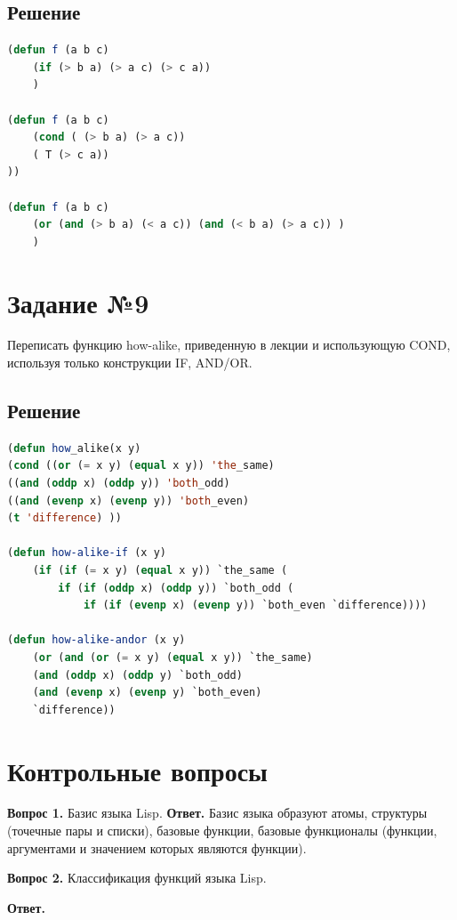 \documentclass[12pt]{report}
\begin{document}
\subsection*{Решение}
\begin{lstlisting}[label=8,caption=Решение задания №8, language=lisp]
(defun f (a b c)
	(if (> b a) (> a c) (> c a))
	)

(defun f (a b c)
	(cond ( (> b a) (> a c))
	( T (> c a))
))

(defun f (a b c)
	(or (and (> b a) (< a c)) (and (< b a) (> a c)) )
	)
\end{lstlisting}


\section*{Задание №9}
Переписать функцию how-alike, приведенную в лекции и использующую COND, используя только конструкции IF, AND/OR.

\subsection*{Решение}
\begin{lstlisting}[label=9,caption=Решение задания №9, language=lisp]
(defun how_alike(x y)
(cond ((or (= x y) (equal x y)) 'the_same)
((and (oddp x) (oddp y)) 'both_odd) 
((and (evenp x) (evenp y)) 'both_even) 
(t 'difference) ))

(defun how-alike-if (x y)
	(if (if (= x y) (equal x y)) `the_same (
		if (if (oddp x) (oddp y)) `both_odd (
			if (if (evenp x) (evenp y)) `both_even `difference))))

(defun how-alike-andor (x y)
	(or (and (or (= x y) (equal x y)) `the_same)
	(and (oddp x) (oddp y) `both_odd)
	(and (evenp x) (evenp y) `both_even)
	`difference))
\end{lstlisting}


	
\section*{Контрольные вопросы}
\textbf{Вопрос 1.} Базис языка Lisp. \newline
\indent\textbf{Ответ. }
Базис языка образуют атомы, структуры (точечные пары и списки), базовые функции, базовые функционалы (функции, аргументами и значением которых являются функции).

\textbf{Вопрос 2.} Классификация функций языка Lisp.
	
\textbf{Ответ.} 
	
\end{document}
